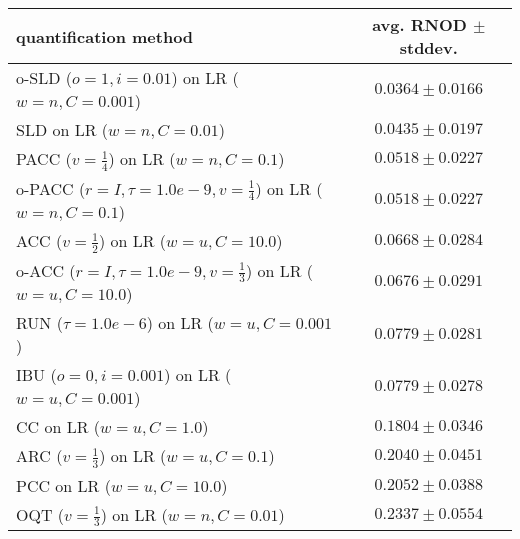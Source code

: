 \begin{tabular}{lc}
  \toprule
  quantification method & avg. RNOD $\pm$ stddev. \\
  \midrule
  o-SLD ($o=1, i=0.01$) on LR ($w=n, C=0.001$) & $\mathbf{0.0364 \pm 0.0166}$ \\
  SLD on LR ($w=n, C=0.01$) & $0.0435 \pm 0.0197$ \\
  PACC ($v=\frac{1}{4}$) on LR ($w=n, C=0.1$) & $0.0518 \pm 0.0227$ \\
  o-PACC ($r=I, \tau=1.0e-9, v=\frac{1}{4}$) on LR ($w=n, C=0.1$) & $0.0518 \pm 0.0227$ \\
  ACC ($v=\frac{1}{2}$) on LR ($w=u, C=10.0$) & $0.0668 \pm 0.0284$ \\
  o-ACC ($r=I, \tau=1.0e-9, v=\frac{1}{3}$) on LR ($w=u, C=10.0$) & $0.0676 \pm 0.0291$ \\
  RUN ($\tau=1.0e-6$) on LR ($w=u, C=0.001$) & $0.0779 \pm 0.0281$ \\
  IBU ($o=0, i=0.001$) on LR ($w=u, C=0.001$) & $0.0779 \pm 0.0278$ \\
  CC on LR ($w=u, C=1.0$) & $0.1804 \pm 0.0346$ \\
  ARC ($v=\frac{1}{3}$) on LR ($w=u, C=0.1$) & $0.2040 \pm 0.0451$ \\
  PCC on LR ($w=u, C=10.0$) & $0.2052 \pm 0.0388$ \\
  OQT ($v=\frac{1}{3}$) on LR ($w=n, C=0.01$) & $0.2337 \pm 0.0554$ \\
  \bottomrule
\end{tabular}
